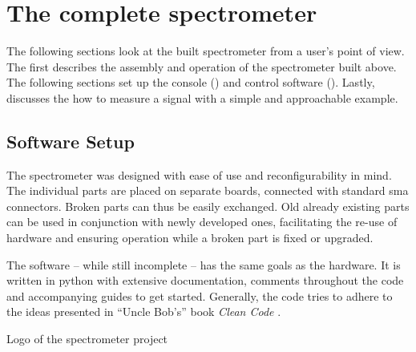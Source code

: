 \chapter{The complete spectrometer}

The following sections look at the built spectrometer from a user's point of view. The first  describes the assembly and operation of the spectrometer built above. The following sections set up the console () and control software (). Lastly,  discusses the how to measure a signal with a simple and approachable example.

\section{Software Setup}
The spectrometer was designed with ease of use and reconfigurability in mind. The individual parts are placed on separate boards, connected with standard \acrshort{sma} connectors. Broken parts can thus be easily exchanged. Old already existing parts can be used in conjunction with newly developed ones, facilitating the re-use of hardware and ensuring operation while a broken part is fixed or upgraded.

The software -- while still incomplete -- has the same goals as the hardware. It is written in \gls{python} with extensive documentation, comments throughout the code and accompanying guides to get started. Generally, the code tries to adhere to the ideas presented in \enquote{Uncle Bob's} book \textit{Clean Code} .

\begin{marginfigure}
    
    \caption{Logo of the \magnethical{} spectrometer project}
\end{marginfigure}

